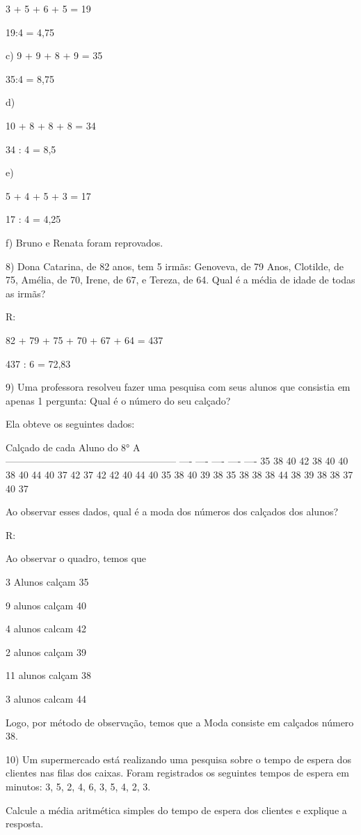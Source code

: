 3 + 5 + 6 + 5 = 19

19:4 = 4,75

c) 9 + 9 + 8 + 9 = 35

35:4 = 8,75

d)

10 + 8 + 8 + 8 = 34

34 : 4 = 8,5

e)

5 + 4 + 5 + 3 = 17

17 : 4 = 4,25

f) Bruno e Renata foram reprovados.

8) Dona Catarina, de 82 anos, tem 5 irmãs: Genoveva, de 79 Anos,
Clotilde, de 75, Amélia, de 70, Irene, de 67, e Tereza, de 64. Qual é a
média de idade de todas as irmãs?

R:

82 + 79 + 75 + 70 + 67 + 64 = 437

437 : 6 = 72,83

9) Uma professora resolveu fazer uma pesquisa com seus alunos que
consistia em apenas 1 pergunta: Qual é o número do seu calçado?

Ela obteve os seguintes dados:

Calçado de cada Aluno do 8° A\\
----------------------------------------------------- ---- ---- ----
---- ---- 35 38 40 42 38 40 40 38 40 44 40 37 42 37 42 42 40 44 40 35 38
40 39 38 35 38 38 38 44 38 39 38 38 37 40 37

Ao observar esses dados, qual é a moda dos números dos calçados dos
alunos?

R:

Ao observar o quadro, temos que

3 Alunos calçam 35

9 alunos calçam 40

4 alunos calcam 42

2 alunos calçam 39

11 alunos calçam 38

3 alunos calcam 44

Logo, por método de observação, temos que a Moda consiste em calçados
número 38.

10) Um supermercado está realizando uma pesquisa sobre o tempo de espera
dos clientes nas filas dos caixas. Foram registrados os seguintes tempos
de espera em minutos: 3, 5, 2, 4, 6, 3, 5, 4, 2, 3.

Calcule a média aritmética simples do tempo de espera dos clientes e
explique a resposta.

